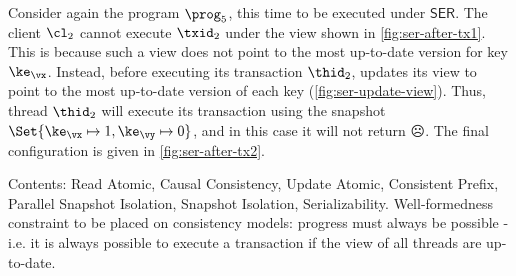 Consider again the program $\prog_5$, this time to be executed under $\mathsf{SER}$. 
The client \( \cl_2 \) cannot execute \( \txid_2 \) under the view shown in \cref{fig:ser-after-tx1}.
This is because such a view does not point to the most up-to-date version for key $\ke_\vx$. 
Instead, before executing its transaction $\thid_2$, updates its view to point to the most up-to-date version of each key (\cref{fig:ser-update-view}). 
Thus, thread $\thid_2$ will execute its transaction using the snapshot $\Set{\ke_\vx \mapsto 1, \ke_\vy \mapsto 0}$, and in this case it will not return \( \sadface \).
The final configuration is given in \cref{fig:ser-after-tx2}.

\ac{Contents: Read Atomic, Causal Consistency, Update Atomic, Consistent Prefix, Parallel Snapshot Isolation, Snapshot Isolation, 
Serializability. Well-formedness constraint to be placed on consistency models: progress must always be possible - i.e. it is 
always possible to execute a transaction if the view of all threads are up-to-date.}  
